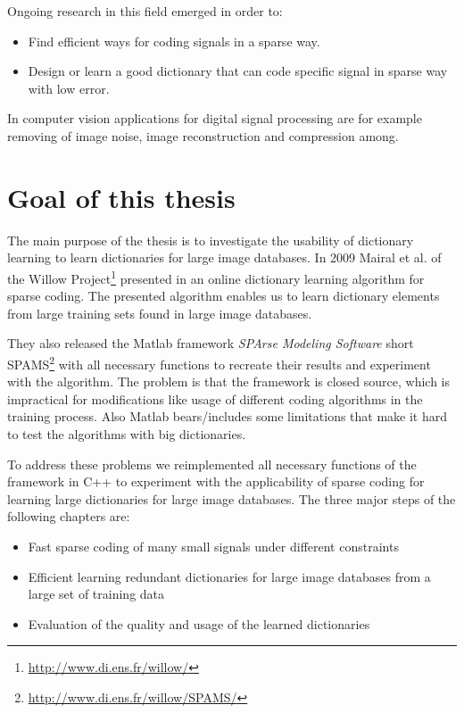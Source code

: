 Ongoing research in this field emerged in order to:
\begin{itemize}
 \item Find efficient ways for coding signals in a sparse way.
 \item Design or learn a good dictionary that can code specific signal in sparse
way with low error.
\end{itemize}
In computer vision applications for digital signal processing are for example
removing of image noise, image reconstruction and compression among.


\section{Goal of this thesis}
The main purpose of the thesis is to investigate the usability of dictionary
learning to learn dictionaries for large image databases. 
In 2009 Mairal et al. of the Willow
Project\footnote{\url{http://www.di.ens.fr/willow/}} presented in
\cite{Mairal2009,Mairal2010} an online dictionary learning algorithm for sparse
coding. The presented algorithm enables us to learn dictionary elements from
large training sets found in large image databases.

They also released the Matlab framework \emph{SPArse Modeling Software}
short SPAMS\footnote{\url{http://www.di.ens.fr/willow/SPAMS/}} with all
necessary functions to recreate their results and experiment with the algorithm.
The problem is that the framework is closed source, which is impractical for
modifications like usage of different coding algorithms in the training process.
Also Matlab bears/includes some limitations that make it hard to test the
algorithms with big dictionaries.

To address these problems we reimplemented all necessary functions of the
framework in C++ to experiment with the applicability of sparse coding for
learning large dictionaries for large image databases. The three major steps of
the following chapters are:

\begin{itemize}
 \item Fast sparse coding of many small signals under different constraints
 \item Efficient learning redundant dictionaries for large image databases from
a large set of training data
 \item Evaluation of the quality and usage of the learned dictionaries
\end{itemize}


